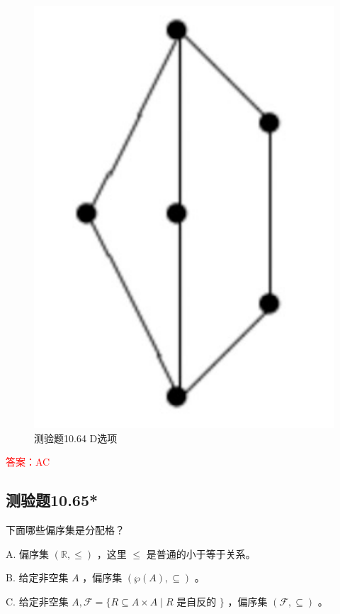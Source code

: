 \documentclass[UTF8, heading=true]{ctexart}
\begin{document}
\begin{figure}[H]
\begin{minipage}[t]{0.2\textwidth}
      \includegraphics[width=1\textwidth]{10.64_4.jpg} %
      \vspace{-0.3cm}
      \caption{测验题10.64 D选项}
\end{minipage}
\end{figure}

\textcolor{red}{答案：AC}

\subsection{测验题10.65*}

下面哪些偏序集是分配格？

A. 偏序集 $(\mathbb{R}, \leq)$ ，这里 $\leq$ 是普通的小于等于关系。

B. 给定非空集 $A$ ，偏序集 $(\wp(A), \subseteq)$ 。

C. 给定非空集 $A, \mathcal{F}=\{R \subseteq A \times A \mid R$ 是自反的 $\}$ ，偏序集 $(\mathcal{F}, \subseteq)$ 。
\end{document}
